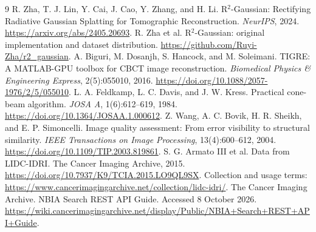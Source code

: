 \documentclass[10pt,a4paper]{article}
\begin{document}
\begin{thebibliography}{9}\small
{} R. Zha, T. J. Lin, Y. Cai, J. Cao, Y. Zhang, and H. Li. R$^2$-Gaussian: Rectifying Radiative Gaussian Splatting for Tomographic Reconstruction. \emph{NeurIPS}, 2024. \url{https://arxiv.org/abs/2405.20693}.
 R. Zha et al. R$^2$-Gaussian: original implementation and dataset distribution. \url{https://github.com/Ruyi-Zha/r2_gaussian}.
 A. Biguri, M. Dosanjh, S. Hancock, and M. Soleimani. TIGRE: A MATLAB-GPU toolbox for CBCT image reconstruction. \emph{Biomedical Physics \& Engineering Express}, 2(5):055010, 2016. \url{https://doi.org/10.1088/2057-1976/2/5/055010}.
 L. A. Feldkamp, L. C. Davis, and J. W. Kress. Practical cone-beam algorithm. \emph{JOSA A}, 1(6):612--619, 1984. \url{https://doi.org/10.1364/JOSAA.1.000612}.
 Z. Wang, A. C. Bovik, H. R. Sheikh, and E. P. Simoncelli. Image quality assessment: From error visibility to structural similarity. \emph{IEEE Transactions on Image Processing}, 13(4):600--612, 2004. \url{https://doi.org/10.1109/TIP.2003.819861}.
 S. G. Armato III et al. Data from LIDC-IDRI. The Cancer Imaging Archive, 2015. \url{https://doi.org/10.7937/K9/TCIA.2015.LO9QL9SX}. Collection and usage terms: \url{https://www.cancerimagingarchive.net/collection/lidc-idri/}.
 The Cancer Imaging Archive. NBIA Search REST API Guide. Accessed 8 October 2026. \url{https://wiki.cancerimagingarchive.net/display/Public/NBIA+Search+REST+API+Guide}.
\end{thebibliography}
\end{document}
